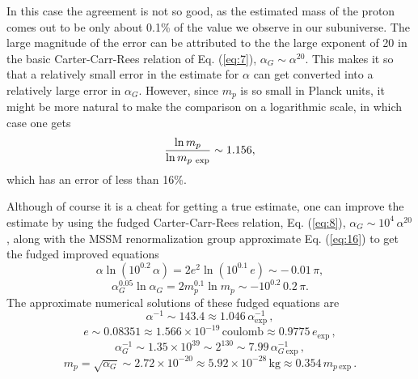 \documentclass[a4paper,12pt]{article}
\begin{document}
	In this case the agreement is not so good,
as the estimated mass of the proton
comes out to be only about 0.1\% of the value
we observe in our subuniverse.
The large magnitude of the error can be attributed
to the the large exponent of 20 in
the basic Carter-Carr-Rees relation of Eq. (\ref{eq:7}),
$\alpha_G \sim \alpha^{20}$.
This makes it so that a relatively small error
in the estimate for $\alpha$ can get converted
into a relatively large error in $\alpha_G$.
However, since $m_p$ is so small in Planck units,
it might be more natural to make the comparison
on a logarithmic scale, in which case one gets
 \begin{equation}
 {\ln{m_p}\over \ln{m_{p\ \mathrm{exp}}}} \sim 1.156,
 \label{eq:28}
 \end{equation}
which has an error of less than 16\%.

	Although of course it is a cheat
for getting a true estimate,
one can improve the estimate by using
the fudged Carter-Carr-Rees relation, Eq. (\ref{eq:8}),
$\alpha_G \sim 10^4\,\alpha^{20}$,
along with the MSSM renormalization group approximate
Eq. (\ref{eq:16}) to get the fudged improved equations
 \begin{equation}
 \alpha\ln{(10^{0.2}\,\alpha)} = 2 e^2\ln{(10^{0.1}\,e)}
  \sim -\,0.01\,\pi,
 \label{eq:29}
 \end{equation}
 \begin{equation}
 \alpha_G^{0.05}\ln{\alpha_G} = 2 m_p^{0.1}\ln{m_p}
                     \sim -10^{0.2}\,0.2\,\pi.
 \label{eq:30}
 \end{equation}
The approximate numerical solutions of these fudged equations are
 \begin{equation}
 \alpha^{-1} \sim 143.4 \approx 1.046\,\alpha_{\mathrm{exp}}^{-1}\,,
 \label{eq:31}
 \end{equation}
 \begin{equation}
 e \sim 0.08351 \approx 1.566 \times 10^{-19} \, \mathrm{coulomb}
   \approx 0.9775 \, e_{\mathrm{exp}}\,,
 \label{eq:32}
 \end{equation}
 \begin{equation}
 \alpha_G^{-1} \sim 1.35 \times 10^{39} \sim 2^{130}
 \sim 7.99 \, \alpha_{G\ \mathrm{exp}}^{-1}\,,
 \label{eq:33}
 \end{equation}
 \begin{equation}
 m_p = \sqrt{\alpha_G} \sim 2.72 \times 10^{-20}
 \approx 5.92 \times 10^{-28} \, \mathrm{kg}
 \approx 0.354 \, m_{p\ \mathrm{exp}}\,.
 \label{eq:34}
 \end{equation}
\end{document}
